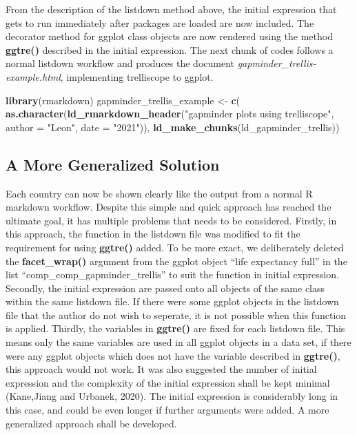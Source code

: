 \documentclass[
]{article}
\newenvironment{Shaded}{\begin{snugshade}}{\end{snugshade}}
\newcommand{\DataTypeTok}[1]{\textcolor[rgb]{0.00,0.34,0.68}{#1}}
\newcommand{\KeywordTok}[1]{\textcolor[rgb]{0.12,0.11,0.11}{\textbf{#1}}}
\newcommand{\NormalTok}[1]{\textcolor[rgb]{0.12,0.11,0.11}{#1}}
\newcommand{\StringTok}[1]{\textcolor[rgb]{0.75,0.01,0.01}{#1}}
\begin{document}
From the description of the listdown method above, the initial
expression that gets to run immediately after packages are loaded are
now included. The decorator method for ggplot class objects are now
rendered using the method \textbf{ggtre()} described in the initial
expression. The next chunk of codes follows a normal listdown workflow
and produces the document \emph{gapminder\_trellis-example.html},
implementing trelliscope to ggplot.

\begin{Shaded}
\begin{Highlighting}[]
\KeywordTok{library}\NormalTok{(rmarkdown)}
\NormalTok{gapminder\_trellis\_example \textless{}{-}}\StringTok{ }\KeywordTok{c}\NormalTok{(}
 \KeywordTok{as.character}\NormalTok{(}\KeywordTok{ld\_rmarkdown\_header}\NormalTok{(}\StringTok{"gapminder plots using trelliscope"}\NormalTok{,}
              \DataTypeTok{author =} \StringTok{"Leon"}\NormalTok{, }\DataTypeTok{date =} \StringTok{"2021"}\NormalTok{)), }\KeywordTok{ld\_make\_chunks}\NormalTok{(ld\_gapminder\_trellis))}
\end{Highlighting}
\end{Shaded}

\hypertarget{a-more-generalized-solution}{%
\subsection{A More Generalized
Solution}\label{a-more-generalized-solution}}

Each country can now be shown clearly like the output from a normal R
markdown workflow. Despite this simple and quick approach has reached
the ultimate goal, it has multiple problems that needs to be considered.
Firstly, in this approach, the function in the listdown file was
modified to fit the requirement for using \textbf{ggtre()} added. To be
more exact, we deliberately deleted the \textbf{facet\_wrap()} argument
from the ggplot object ``life expectancy full'' in the list
``comp\_comp\_gapminder\_trellis'' to suit the function in initial
expression. Secondly, the initial expression are passed onto all objects
of the same class within the same listdown file. If there were some
ggplot objects in the listdown file that the author do not wish to
seperate, it is not possible when this function is applied. Thirdly, the
variables in \textbf{ggtre()} are fixed for each listdown file. This
means only the same variables are used in all ggplot objects in a data
set, if there were any ggplot objects which does not have the variable
described in \textbf{ggtre()}, this approach would not work. It was also
suggested the number of initial expression and the complexity of the
initial expression shall be kept minimal (Kane,Jiang and Urbanek, 2020).
The initial expression is considerably long in this case, and could be
even longer if further arguments were added. A more generalized approach
shall be developed.
\end{document}
